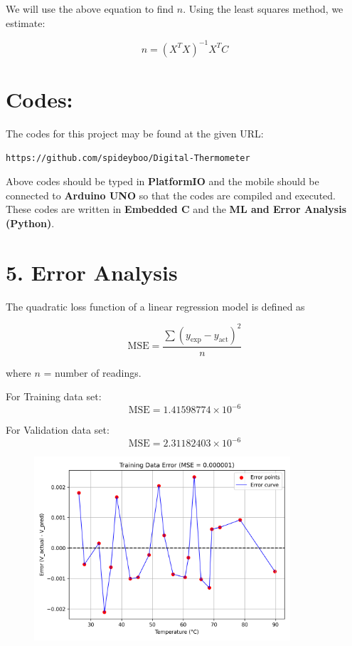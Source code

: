 \documentclass[12pt,a4paper]{article}
\begin{document}
We will use the above equation to find \( n \).  
Using the least squares method, we estimate:

\[
n = (X^{T}X)^{-1}X^{T}C
\]

\vspace{1em}
\noindent
\section*{Codes:}

The codes for this project may be found at the given URL:  
\begin{center}
	\texttt{https://github.com/spideyboo/Digital-Thermometer}
\end{center}

\noindent
Above codes should be typed in \textbf{PlatformIO} and the mobile should be connected to \textbf{Arduino UNO} so that the codes are compiled and executed.  
These codes are written in \textbf{Embedded C} and the \textbf{ML and Error Analysis (Python)}.

\newpage

\section*{5. Error Analysis}

The quadratic loss function of a linear regression model is defined as

\[
\text{MSE} = \frac{\sum{(y_{\text{exp}} - y_{\text{act}})^2}}{n}
\]

where \( n \) = number of readings.

\vspace{10pt}

For Training data set:
\[
\text{MSE} = 1.41598774 \times 10^{-6}
\]

For Validation data set:
\[
\text{MSE} = 2.31182403 \times 10^{-6}
\]

\begin{figure}[h!]
    \centering
    \includegraphics[width=0.85\textwidth]{../figs/train_error.png}
\end{figure}
\end{document}
